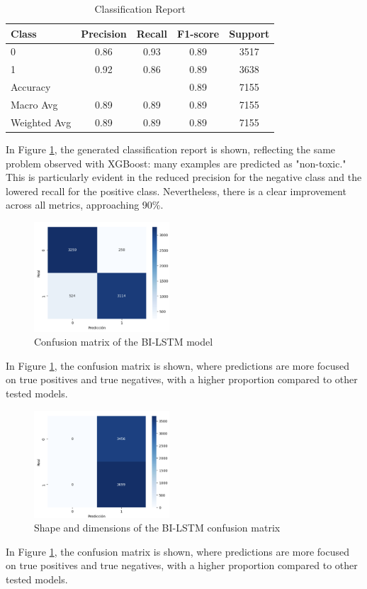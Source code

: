 \begin{table}[H]
\centering
\caption{Classification Report}
\label{tab:classification_report}
\begin{tabular}{lcccc}
\toprule
Class        & Precision & Recall & F1-score & Support \\
\midrule
0            & 0.86      & 0.93   & 0.89     & 3517    \\
1            & 0.92      & 0.86   & 0.89     & 3638    \\
\midrule
Accuracy     &           &        & 0.89     & 7155    \\
Macro Avg    & 0.89      & 0.89   & 0.89     & 7155    \\
Weighted Avg & 0.89      & 0.89   & 0.89     & 7155    \\
\bottomrule
\end{tabular}
\end{table}

In Figure \ref{fig:confusion_matrix_bilstm}, the generated classification report is shown, reflecting the same problem observed with XGBoost: many examples are predicted as "non-toxic." This is particularly evident in the reduced precision for the negative class and the lowered recall for the positive class. Nevertheless, there is a clear improvement across all metrics, approaching 90\%.

\begin{figure}[H]
    \centering
    \includegraphics[width=0.45\textwidth]{images/confuction_matriz_bilstm.png}
    \caption{Confusion matrix of the BI-LSTM model}
    \label{fig:confusion_matrix_bilstm}
\end{figure}

In Figure \ref{fig:confusion_matrix_bilstm}, the confusion matrix is shown, where predictions are more focused on true positives and true negatives, with a higher proportion compared to other tested models.

\begin{figure}[H]
    \centering
    \includegraphics[width=0.45\textwidth]{images/confuction_matriz_bilstm_shapeY.png}
    \caption{Shape and dimensions of the BI-LSTM confusion matrix}
    \label{fig:confusion_matrix_bilstm_shapeY}
\end{figure}

In Figure \ref{fig:confusion_matrix_bilstm}, the confusion matrix is shown, where predictions are more focused on true positives and true negatives, with a higher proportion compared to other tested models.
